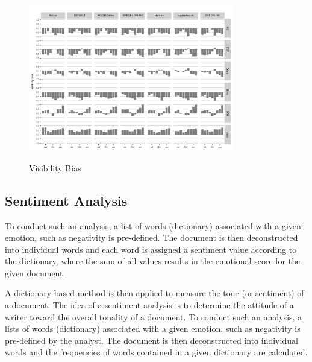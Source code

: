 \documentclass[12pt,a4paper,notitlepage]{article}
\begin{document}
\begin{figure}[H]
	\caption{Visibility Bias}
	\begin{center}
		\includegraphics[width=0.8\textwidth]{../figs/visibility_bias.png}
		\label{fig_visibility_bias}
	\end{center}
\end{figure}


\subsection{Sentiment Analysis}

To conduct such an analysis, a list of words (dictionary) associated with a given emotion, such as negativity is pre-defined. The document is then deconstructed into individual words and each word is assigned a sentiment value according to the dictionary, where the sum of all values results in the emotional score for the given document. 

A dictionary-based method is then applied to measure the tone (or sentiment) of a document. The idea of a sentiment analysis is to determine the attitude of a writer toward the overall tonality of a document. To conduct such an analysis, a lists of words (dictionary) associated with a given emotion, such as negativity is pre-defined by the analyst. The document is then deconstructed into individual words and the frequencies of words contained in a given dictionary are calculated. 
\end{document}
